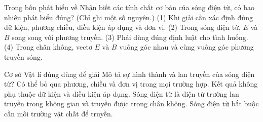 \begin{ex}
Trong bốn phát biểu về Nhận biết các tính chất cơ bản của sóng điện từ, có bao nhiêu phát biểu đúng? (Chỉ ghi một số nguyên.) (1) Khi giải cần xác định đúng dữ kiện, phương chiều, điều kiện áp dụng và đơn vị. (2) Trong sóng điện từ, $E$ và $B$ song song với phương truyền. (3) Phải dùng đúng định luật cho tình huống. (4) Trong chân không, vectơ $E$ và $B$ vuông góc nhau và cùng vuông góc phương truyền sóng.
\end{ex}

\begin{ex}
Cơ sở Vật lí đúng dùng để giải Mô tả sự hình thành và lan truyền của sóng điện từ?
\choice
{Có thể bỏ qua phương, chiều và đơn vị trong mọi trường hợp.}
{Kết quả không phụ thuộc dữ kiện và điều kiện áp dụng.}
{\True Sóng điện từ là điện từ trường lan truyền trong không gian và truyền được trong chân không.}
{Sóng điện từ bắt buộc cần môi trường vật chất để truyền.}
\end{ex}

